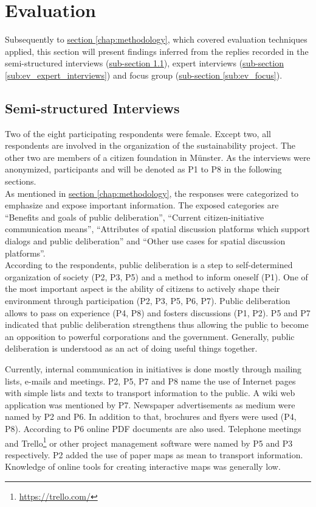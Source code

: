 \section{Evaluation}
\label{chap:evaluation}
Subsequently to \hyperref[chap:methodology]{section \ref{chap:methodology}}, which covered evaluation techniques applied, this section will present findings inferred from the replies recorded in the semi-structured interviews (\hyperref[sub:ev_interviews]{sub-section \ref{sub:ev_interviews}}), expert interviews (\hyperref[sub:ev_expert_interviews]{sub-section \ref{sub:ev_expert_interviews}}) and focus group (\hyperref[sub:ev_focus]{sub-section \ref{sub:ev_focus}}).


\subsection{Semi-structured Interviews}
\label{sub:ev_interviews}
Two of the eight participating respondents were female. Except two, all respondents are involved in the organization of the sustainability project. The other two are members of a citizen foundation in M{\"u}nster. As the interviews were anonymized, participants and will be denoted as P1 to P8 in the following sections.\\
As mentioned in \hyperref[chap:methodology]{section \ref{chap:methodology}}, the responses were categorized to emphasize and expose important information. The exposed categories are ``Benefits and goals of public deliberation'', ``Current citizen-initiative communication means'', ``Attributes of spatial discussion platforms which support dialogs and public deliberation'' and ``Other use cases for spatial discussion platforms''.\\ %

According to the respondents, public deliberation is a step to self-determined organization of society (P2, P3, P5) and a method to inform oneself (P1). One of the most important aspect is the ability of citizens to actively shape their environment through participation (P2, P3, P5, P6, P7). Public deliberation allows to pass on experience (P4, P8) and fosters discussions (P1, P2). P5 and P7 indicated that public deliberation strengthens thus allowing the public to become an opposition to powerful corporations and the government. Generally, public deliberation is understood as an act of doing useful things together.

Currently, internal communication in initiatives is done mostly through mailing lists, e-mails and meetings. P2, P5, P7 and P8 name the use of Internet pages with simple lists and texts to transport information to the public. A wiki web application was mentioned by P7. Newspaper advertisements as medium were named by P2 and P6. In addition to that, brochures and flyers were used (P4, P8). According to P6 online PDF documents are also used. Telephone meetings and Trello\footnote{\url{https://trello.com/}} or other project management software were named by P5 and P3 respectively. P2 added the use of paper maps as mean to transport information. Knowledge of online tools for creating interactive maps was generally low.

